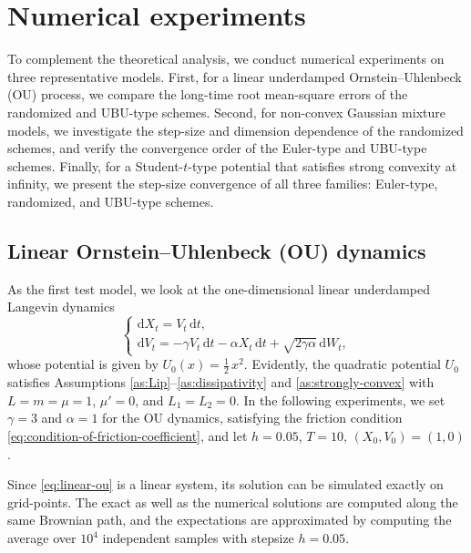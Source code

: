 \documentclass[12pt]{article}
\numberwithin{equation}{section}
\begin{document}
\section{Numerical experiments} \label{sec:num-ex} 
To complement the theoretical analysis, we conduct numerical experiments on three representative models. 
First, for a linear underdamped Ornstein--Uhlenbeck (OU) process, we compare the long-time root mean-square errors of the randomized and UBU-type schemes.
Second, for non-convex Gaussian mixture models, we investigate the step-size and dimension dependence of the randomized schemes, and verify the convergence order of the Euler-type and UBU-type schemes. 
Finally, for a Student-$t$-type potential that satisfies strong convexity at infinity, we present the step-size convergence of all three families: Euler-type, randomized, and UBU-type schemes. 
%

%
\subsection{Linear Ornstein--Uhlenbeck (OU) dynamics}
\label{subsec:experiment-linear}

As the first test model, we look at the one-dimensional linear underdamped Langevin dynamics
\begin{equation}
\begin{cases}
\mathrm{d}X_t=V_t\,\mathrm{d}t,\\
\mathrm{d}V_t=-\gamma V_t\,\mathrm{d}t-\alpha X_t\,\mathrm{d}t
+\sqrt{2\gamma\alpha}\,\mathrm{d}W_t,
\end{cases}
\label{eq:linear-ou}
\end{equation}
whose potential is given by
\(
U_0(x)=\frac{1}{2}\,x^2.
\)
Evidently, the quadratic potential $U_0$ satisfies Assumptions \ref{as:Lip}–\ref{as:dissipativity} and \ref{as:strongly-convex} with $L=m=\mu=1$, $\mu'=0$, and $L_1=L_2=0$. 
In the following experiments, we set $\gamma=3$ and $\alpha=1$ for the OU dynamics, satisfying the friction condition \eqref{eq:condition-of-friction-coefficient}, and let $h=0.05$, $T=10$, $(X_0,V_0)=(1,0)$.

Since \eqref{eq:linear-ou} is a linear system, its solution can be simulated exactly on grid-points. 
The exact as well as the numerical solutions are computed along the same Brownian path, and the expectations are approximated by computing the average over $10^4$ independent samples with stepsize $h=0.05$.
\end{document}
